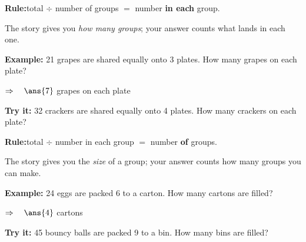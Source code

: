 \documentclass[12pt]{article}
\begin{document}


\begin{formulabox}
\textbf{Rule:}\quad total $\div$ number of groups $=$ number \textbf{in each} group.\par
The story gives you \emph{how many groups}; your answer counts what lands in each one.
\end{formulabox}

\begin{examplebox}
\textbf{Example:} 21 grapes are shared equally onto 3 plates. How many grapes on each plate?

$\Rightarrow\quad\ans{7}$ grapes on each plate
\end{examplebox}

\begin{tryitbox}
\textbf{Try it:} 32 crackers are shared equally onto 4 plates. How many crackers on each plate?\\[2pt]
\end{tryitbox}


\begin{formulabox}
\textbf{Rule:}\quad total $\div$ number in each group $=$ number \textbf{of} groups.\par
The story gives you the \emph{size} of a group; your answer counts how many groups you can make.
\end{formulabox}

\begin{examplebox}
\textbf{Example:} 24 eggs are packed 6 to a carton. How many cartons are filled?

$\Rightarrow\quad\ans{4}$ cartons
\end{examplebox}

\begin{tryitbox}
\textbf{Try it:} 45 bouncy balls are packed 9 to a bin. How many bins are filled?\\[2pt]
\end{tryitbox}
\end{document}
